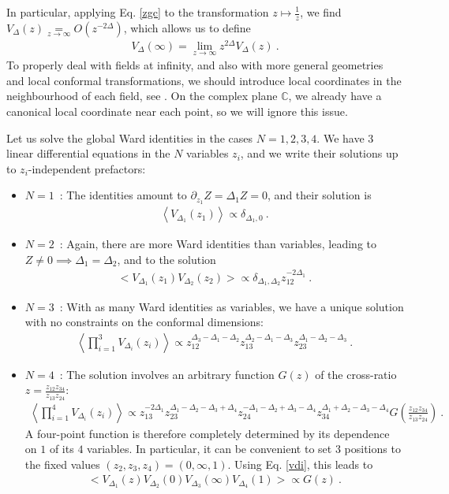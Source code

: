 \documentclass[12pt, a4paper]{article}
\theoremstyle{break}
\begin{document}
In particular, applying Eq. \eqref{zgc} to the transformation $z\mapsto \frac{1}{z}$, we find $V_\Delta(z)\underset{z\to\infty}{=} O(z^{-2\Delta})$, which allows us to define 
\begin{align}
 V_\Delta(\infty) = \lim_{z\to\infty} z^{2\Delta}V_\Delta(z)\ . 
 \label{vdi}
\end{align}
To properly deal with fields at infinity, and also with more general geometries and local conformal transformations, we should introduce local coordinates in the neighbourhood of each field, see \cite[Section 6.2]{br21}. On the complex plane $\mathbb{C}$, we already have a canonical local coordinate near each point, so we will ignore this issue. 

Let us solve the global Ward identities in the cases $N=1,2,3,4$. We have $3$ linear differential equations in the $N$ variables $z_i$, and we write their solutions up to $z_i$-independent prefactors:
\begin{itemize}
 \item $\boxed{N=1}$\ : The identities amount to $\partial_{z_1} Z = \Delta_1 Z=0$, and their solution is 
 \begin{align}
  \left<V_{\Delta_1}(z_1)\right>\propto \delta_{\Delta_1,0}\ . 
 \end{align}
 \item $\boxed{N=2}$\ : Again, there are more Ward identities than variables, leading to $Z\neq 0\implies \Delta_1=\Delta_2$, and to the solution
 \begin{align}
 \Big< V_{\Delta_1}(z_1)V_{\Delta_2}(z_2) \Big> \propto \delta_{\Delta_1,\Delta_2} z_{12}^{-2\Delta_1} \ .
 \label{2pt}
\end{align}
\item $\boxed{N=3}$\ : With as many Ward identities as variables, we have a unique solution with no constraints on the conformal dimensions:
\begin{align}
 \left< \prod_{i=1}^3 V_{\Delta_i}(z_i) \right> \propto z_{12}^{\Delta_3-\Delta_1-\Delta_2} z_{13}^{\Delta_2-\Delta_1-\Delta_3} z_{23}^{\Delta_1-\Delta_2-\Delta_3}\ .
 \label{3pt}
\end{align}
\item $\boxed{N=4}$\ : The solution involves an arbitrary function $G(z)$ of the cross-ratio $z=\frac{z_{12}z_{34}}{z_{13}z_{24}}$:
\begin{align}
 \left< \prod_{i=1}^4 V_{\Delta_i}(z_i) \right> 
 \propto z_{13}^{-2\Delta_1} z_{23}^{\Delta_1-\Delta_2-\Delta_3+\Delta_4} z_{24}^{-\Delta_1-\Delta_2+\Delta_3-\Delta_4} z_{34}^{\Delta_1+\Delta_2-\Delta_3-\Delta_4} G\left(\frac{z_{12}z_{34}}{z_{13}z_{24}}\right)\ .
 \label{4pt}
\end{align}
A four-point function is therefore completely determined by its dependence on $1$ of its $4$ variables. In particular, it can be convenient to set $3$ positions to the fixed values $(z_2,z_3,z_4)=(0,\infty,1)$. Using Eq. \eqref{vdi}, this leads to 
\begin{align}
 \Big< V_{\Delta_1}(z) V_{\Delta_2}(0)V_{\Delta_3}(\infty)V_{\Delta_4}(1) \Big> \propto G(z)\ . 
\end{align}
\end{itemize}
\end{document}
